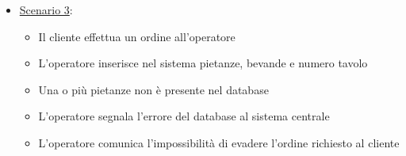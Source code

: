 \begin{enumerate}
\begin{itemize}
\begin{itemize}
\begin{itemize}
                \item L'operatore comunica l'impossibilit\`a di evadere l'ordine richiesto al cliente
            \end{itemize}
            \item \uline{Scenario 3}:
            \begin{itemize}
                \item Il cliente effettua un ordine all'operatore
                \item L'operatore inserisce nel sistema pietanze, bevande e numero tavolo
                \item Una o pi\`u pietanze non \`e presente nel database
                \item L'operatore segnala l'errore del database al sistema centrale
                \item L'operatore comunica l'impossibilit\`a di evadere l'ordine richiesto al cliente
            \end{itemize}
        \end{itemize}
    \end{itemize}


\end{enumerate}
